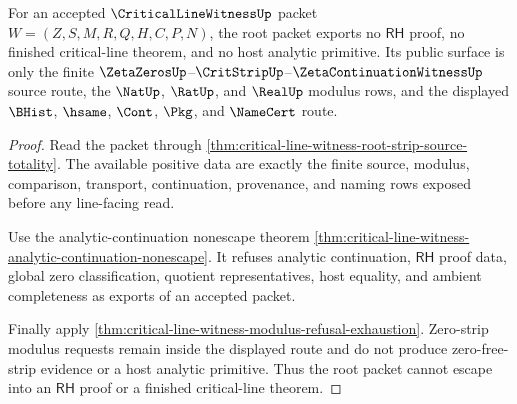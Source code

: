 \begin{theorem}
\label{thm:critical-line-witness-rh-boundary-nonescape}
For an accepted $\CriticalLineWitnessUp$ packet $W=(Z,S,M,R,Q,H,C,P,N)$, the
root packet exports no $\mathsf{RH}$ proof, no finished critical-line theorem,
and no host analytic primitive. Its public surface is only the finite
$\ZetaZerosUp$--$\CritStripUp$--$\ZetaContinuationWitnessUp$ source route,
the $\NatUp$, $\RatUp$, and $\RealUp$ modulus rows, and the displayed
$\BHist$, $\hsame$, $\Cont$, $\Pkg$, and $\NameCert$ route.
\end{theorem}
\begin{proof}
Read the packet through
\autoref{thm:critical-line-witness-root-strip-source-totality}. The available
positive data are exactly the finite source, modulus, comparison, transport,
continuation, provenance, and naming rows exposed before any line-facing read.

Use the analytic-continuation nonescape theorem
\autoref{thm:critical-line-witness-analytic-continuation-nonescape}. It
refuses analytic continuation, $\mathsf{RH}$ proof data, global zero
classification, quotient representatives, host equality, and ambient
completeness as exports of an accepted packet.

Finally apply
\autoref{thm:critical-line-witness-modulus-refusal-exhaustion}. Zero-strip
modulus requests remain inside the displayed route and do not produce
zero-free-strip evidence or a host analytic primitive. Thus the root packet
cannot escape into an $\mathsf{RH}$ proof or a finished critical-line theorem.
\end{proof}
